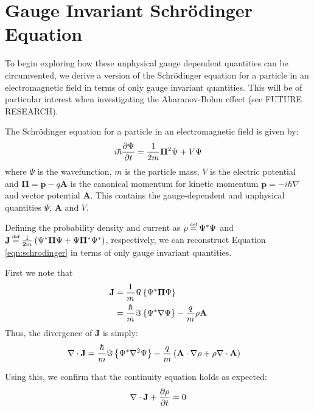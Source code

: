 \section{Gauge Invariant Schr\"odinger Equation}
\label{sec:gise}

To begin exploring how these unphysical gauge dependent quantities can be
circumvented, we derive a version of the Schr\"odinger equation for a particle
in an electromagnetic field in terms of only gauge invariant quantities. This
will be of particular interest when investigating the Aharanov-Bohm effect (see
FUTURE RESEARCH).

The Schr\"odinger equation for a particle in an electromagnetic field is given
by:
\begin{align}
    i \hbar \frac{\partial \Psi}{\partial t} = \frac{1}{2m}\mathbf{\Pi}^2 \Psi + V \Psi
    \label{eqn:schrodinger}
\end{align}
where $\Psi$ is the wavefunction, $m$ is the particle mass, $V$ is the electric
potential and $\mathbf{\Pi} = \mathbf{p} - q\mathbf{A}$ is the canonical momentum for
kinetic momentum $\mathbf{p} = - i \hbar \nabla$ and vector potential
$\mathbf{A}$\cite[Ch. 4]{aharonov-rohrlich-2008}. This contains the
gauge-dependent and unphysical quantities $\Psi$, $\mathbf{A}$ and $V$.

Defining the probability density and current as $\rho \defeq \Psi^*\Psi$ and
$\mathbf{J} \defeq \frac{1}{2m}\left( \Psi^* \mathbf{\Pi} \Psi + \Psi
\mathbf{\Pi}^* \Psi^* \right)$, respectively, we can reconstruct Equation
\ref{eqn:schrodinger} in terms of only gauge invariant quantities.

First we note that
\begin{align}
    \mathbf{J} &= \frac{1}{m} \Re \left\{ \Psi^* \mathbf{\Pi} \Psi \right\} \\
               &= \frac{\hbar}{m} \Im \left\{ \Psi^* \nabla \Psi \right\} - \frac{q}{m} \rho
                    \mathbf{A}
\end{align}
Thus, the divergence of $\mathbf{J}$ is simply:
\begin{align}
    \nabla \cdot \mathbf{ J } &= \frac{\hbar}{m} \Im \left\{ \Psi^* \nabla^2 \Psi \right\} - \frac{q}{m} \left(
                \mathbf{A} \cdot \nabla \rho + \rho \nabla \cdot
                \mathbf{A} \right)
\end{align}

Using this, we confirm that the continuity equation holds as expected:
\begin{align}
    \nabla \cdot \mathbf{ J } + \frac{\partial \rho}{\partial t} = 0
    \label{eqn:continuity}
\end{align}

